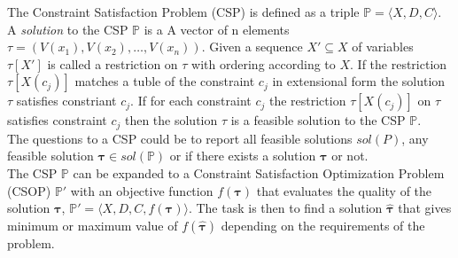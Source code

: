The Constraint Satisfaction Problem (CSP) is defined as a triple $\mathbb{P} = \langle X,D,C \rangle$. A 
\emph{solution} to the CSP $\mathbb{P}$ is a 
A vector of n elements 
$\tau = (V(x_1), V(x_2), \dots , V(x_n))$.  %
Given a sequence $X' \subseteq X$ of variables $\tau[X']$ is called a restriction on $\tau$ with ordering according to 
$X$. If the restriction $\tau[X(c_j)]$ matches a tuble of the constraint $c_j$ in extensional form the solution $\tau$ 
satisfies constriant $c_j$. If for each constraint $c_j$ the restriction $\tau[X(c_j)]$ on $\tau$ satisfies constraint 
$c_j$ then the solution $\tau$ is a feasible solution to the CSP $\mathbb{P}$. \\
The questions to a CSP could be to report all feasible solutions $sol(P)$, any feasible solution $\mathbf{\tau}\in 
sol(\mathbb{P})$ or if there exists a solution $\mathbf{\tau}$ or not. \\
The CSP $\mathbb{P}$ can be expanded to a Constraint Satisfaction Optimization Problem (CSOP) $\mathbb{P'}$ 
with an objective function $f(\mathbf{\tau})$ that evaluates the quality of the solution $\mathbf{\tau}$, $\mathbb{P'} 
= \langle X,D,C,f(\mathbf{\tau}) \rangle$. The task is then to find a solution $\hat{\mathbf{\tau}}$ that gives minimum 
or maximum value of $f(\hat{\mathbf{\tau}})$ depending on the requirements of the problem. 
